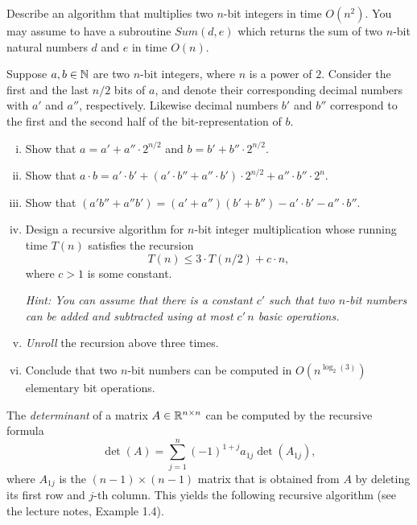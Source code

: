 \documentclass[11pt]{article}
\institute{\'Ecole Polytechnique F\'ed\'erale de Lausanne}
\begin{document}
\makeheader


\problem
Describe an algorithm that multiplies two $n$-bit integers in time $O(n^2)$. You may assume to have a subroutine $Sum(d,e)$ which returns the sum of two $n$-bit natural numbers $d$ and $e$ in time $O(n)$.
 
\problem Suppose $a,b \in \mathbb{N}$ are two $n$-bit integers, where $n$ is a power of $2$. Consider the first and the last $n/2$ bits of $a$, and denote their corresponding decimal numbers with $a'$ and $a''$, respectively. Likewise decimal numbers $b'$ and $b''$ correspond to the first and the second half of the bit-representation of $b$. 
  \begin{enumerate}[i)]
  \item Show that $a = a' + a'' \cdot 2^{n/2}$ and  $b = b' + b'' \cdot 2^{n/2}$.
  \item Show that $a \cdot b = a' \cdot b' + (a' \cdot b'' + a'' \cdot b') \cdot 2^{n/2} + a'' \cdot b'' \cdot 2^n $. 
  \item Show that $(a'b''+a''b') = (a'+a'')(b'+b'') - a'\cdot b' - a'' \cdot b''$. 
  \item Design a recursive algorithm for $n$-bit integer multiplication whose running time $T(n)$  satisfies the recursion 
    \begin{displaymath}
      T(n) \leq  3 \cdot T( n/2  ) + c \cdot n,
    \end{displaymath}
where $c>1$ is some constant. 

\emph{Hint: You can assume that there is a constant $c'$ such that two $n$-bit numbers can be added and subtracted using at most $c'\, n$ basic operations. }

\item \emph{Unroll} the recursion above three times. 

\item Conclude that two $n$-bit
    numbers can be computed in $O(n^{\log_2(3)})$
    elementary bit operations. 
  \end{enumerate}
  
\problem 
The \emph{determinant} of a matrix $A \in \mathbb{R}^{n \times n}$ can be computed by the recursive formula 
\begin{displaymath}
  \det(A) = \sum_{j=1}^n (-1)^{1+j}a_{1j} \det(A_{1j}),
\end{displaymath}
where $A_{1j}$ is the $(n-1)×(n-1)$ matrix that is obtained from $A$ by deleting its first row and $j$-th column.  This yields the following recursive algorithm (see the lecture notes, Example 1.4). 
\end{document}
